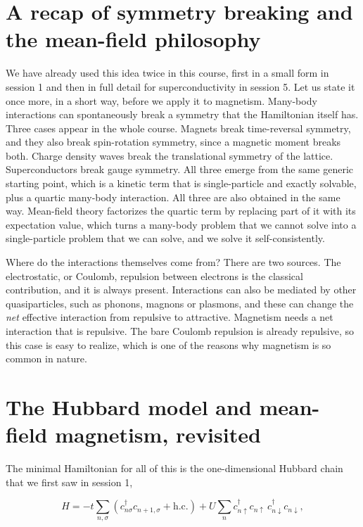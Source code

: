 \section{A recap of symmetry breaking and the mean-field philosophy}

We have already used this idea twice in this course, first in a small form in session 1 and then in
full detail for superconductivity in session 5. Let us state it once more, in a short way, before we
apply it to magnetism. Many-body interactions can spontaneously break a symmetry that the Hamiltonian
itself has. Three cases appear in the whole course. Magnets break time-reversal symmetry, and they
also break spin-rotation symmetry, since a magnetic moment breaks both. Charge density waves break the translational
symmetry of the lattice. Superconductors break gauge symmetry. All three emerge from the same generic
starting point, which is a kinetic term that is single-particle and exactly solvable, plus a quartic
many-body interaction. All three are also obtained in the same way. Mean-field theory factorizes the
quartic term by replacing part of it with its expectation value, which turns a many-body problem that
we cannot solve into a single-particle problem that we can solve, and we solve it self-consistently.

Where do the interactions themselves come from? There are two sources. The electrostatic, or Coulomb,
repulsion between electrons is the classical contribution, and it is always present. Interactions can
also be mediated by other quasiparticles, such as phonons, magnons or plasmons, and these can change
the \emph{net} effective interaction from repulsive to attractive. Magnetism needs a net interaction
that is repulsive. The bare Coulomb repulsion is already repulsive, so this case is easy to realize,
which is one of the reasons why magnetism is so common in nature.

\section{The Hubbard model and mean-field magnetism, revisited}

The minimal Hamiltonian for all of this is the one-dimensional Hubbard chain that we first saw in
session 1,

\begin{equation}
H = -t\sum_{n,\sigma}\left(c_{n\sigma}^\dagger c_{n+1,\sigma} + \text{h.c.}\right) + U\sum_n c_{n\uparrow}^\dagger c_{n\uparrow}\, c_{n\downarrow}^\dagger c_{n\downarrow},
\end{equation}


